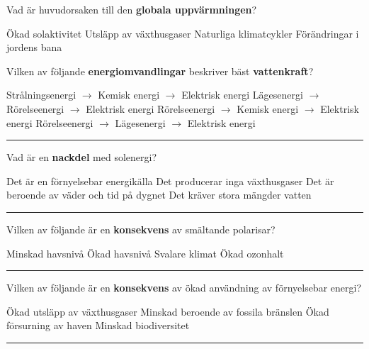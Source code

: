 \documentclass{exam}
\begin{document}
\begin{questions}
\question Vad är huvudorsaken till den \textbf{globala uppvärmningen}?
\begin{checkboxes}
    \choice Ökad solaktivitet
    \correctchoice Utsläpp av växthusgaser
    \choice Naturliga klimatcykler
    \choice Förändringar i jordens bana
\end{checkboxes}
\break
\question Vilken av följande \textbf{energiomvandlingar} beskriver bäst \textbf{vattenkraft}?
\begin{checkboxes}
   \choice Strålningsenergi $\to$ Kemisk energi $\to$ Elektrisk energi
   \correctchoice Lägesenergi $\to$ Rörelseenergi $\to$ Elektrisk energi
   \choice Rörelseenergi $\to$ Kemisk energi $\to$ Elektrisk energi
   \choice Rörelseenergi $\to$ Lägesenergi $\to$ Elektrisk energi
\end{checkboxes}

\vspace{5mm} 
\hrule 
\vspace{5mm} 

\question Vad är en \textbf{nackdel} med solenergi?
\begin{checkboxes}
    \choice Det är en förnyelsebar energikälla
    \choice Det producerar inga växthusgaser
    \correctchoice Det är beroende av väder och tid på dygnet
    \choice Det kräver stora mängder vatten
\end{checkboxes}

\vspace{5mm} 
\hrule 
\vspace{5mm} 

\question Vilken av följande är en \textbf{konsekvens} av smältande polarisar?
\begin{checkboxes}
   \choice Minskad havsnivå
   \correctchoice Ökad havsnivå
   \choice Svalare klimat
   \choice Ökad ozonhalt
\end{checkboxes}

\vspace{5mm} 
\hrule 
\vspace{5mm} 

\question Vilken av följande är en \textbf{konsekvens} av ökad användning av förnyelsebar energi?
\begin{checkboxes}
   \choice Ökad utsläpp av växthusgaser
   \correctchoice Minskad beroende av fossila bränslen
   \choice Ökad försurning av haven
   \choice Minskad biodiversitet
\end{checkboxes}

\vspace{5mm} 
\hrule 
\vspace{5mm} 


\end{questions}
\end{document}
